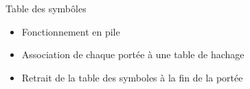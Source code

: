 \begin{frame}{Table des symbôles}
    \begin{block}{}
        \begin{itemize}
            \item Fonctionnement en pile
            \item Association de chaque portée à une table de hachage
            \item Retrait de la table des symboles à la fin de la portée
        \end{itemize}
    \end{block}
\end{frame}
